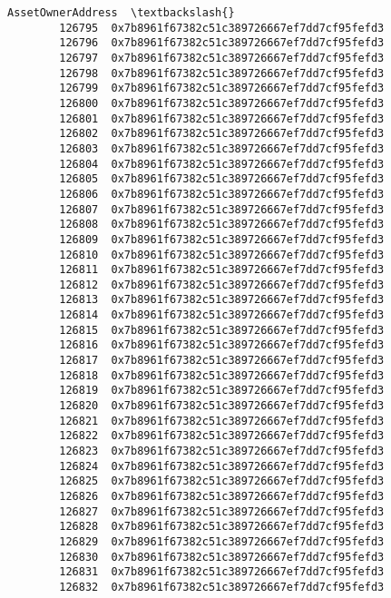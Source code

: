 \documentclass[11pt]{article}
\begin{document}
\begin{Verbatim}[commandchars=\\\{\}]
                                         AssetOwnerAddress  \textbackslash{}
        126795  0x7b8961f67382c51c389726667ef7dd7cf95fefd3   
        126796  0x7b8961f67382c51c389726667ef7dd7cf95fefd3   
        126797  0x7b8961f67382c51c389726667ef7dd7cf95fefd3   
        126798  0x7b8961f67382c51c389726667ef7dd7cf95fefd3   
        126799  0x7b8961f67382c51c389726667ef7dd7cf95fefd3   
        126800  0x7b8961f67382c51c389726667ef7dd7cf95fefd3   
        126801  0x7b8961f67382c51c389726667ef7dd7cf95fefd3   
        126802  0x7b8961f67382c51c389726667ef7dd7cf95fefd3   
        126803  0x7b8961f67382c51c389726667ef7dd7cf95fefd3   
        126804  0x7b8961f67382c51c389726667ef7dd7cf95fefd3   
        126805  0x7b8961f67382c51c389726667ef7dd7cf95fefd3   
        126806  0x7b8961f67382c51c389726667ef7dd7cf95fefd3   
        126807  0x7b8961f67382c51c389726667ef7dd7cf95fefd3   
        126808  0x7b8961f67382c51c389726667ef7dd7cf95fefd3   
        126809  0x7b8961f67382c51c389726667ef7dd7cf95fefd3   
        126810  0x7b8961f67382c51c389726667ef7dd7cf95fefd3   
        126811  0x7b8961f67382c51c389726667ef7dd7cf95fefd3   
        126812  0x7b8961f67382c51c389726667ef7dd7cf95fefd3   
        126813  0x7b8961f67382c51c389726667ef7dd7cf95fefd3   
        126814  0x7b8961f67382c51c389726667ef7dd7cf95fefd3   
        126815  0x7b8961f67382c51c389726667ef7dd7cf95fefd3   
        126816  0x7b8961f67382c51c389726667ef7dd7cf95fefd3   
        126817  0x7b8961f67382c51c389726667ef7dd7cf95fefd3   
        126818  0x7b8961f67382c51c389726667ef7dd7cf95fefd3   
        126819  0x7b8961f67382c51c389726667ef7dd7cf95fefd3   
        126820  0x7b8961f67382c51c389726667ef7dd7cf95fefd3   
        126821  0x7b8961f67382c51c389726667ef7dd7cf95fefd3   
        126822  0x7b8961f67382c51c389726667ef7dd7cf95fefd3   
        126823  0x7b8961f67382c51c389726667ef7dd7cf95fefd3   
        126824  0x7b8961f67382c51c389726667ef7dd7cf95fefd3   
        126825  0x7b8961f67382c51c389726667ef7dd7cf95fefd3   
        126826  0x7b8961f67382c51c389726667ef7dd7cf95fefd3   
        126827  0x7b8961f67382c51c389726667ef7dd7cf95fefd3   
        126828  0x7b8961f67382c51c389726667ef7dd7cf95fefd3   
        126829  0x7b8961f67382c51c389726667ef7dd7cf95fefd3   
        126830  0x7b8961f67382c51c389726667ef7dd7cf95fefd3   
        126831  0x7b8961f67382c51c389726667ef7dd7cf95fefd3   
        126832  0x7b8961f67382c51c389726667ef7dd7cf95fefd3   
        

\end{Verbatim}
\end{document}

